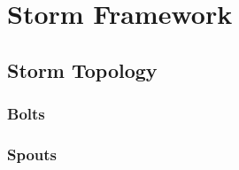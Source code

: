 \section{Storm Framework}
\label{sect:Architecture}


\subsection{Storm Topology}

\subsubsection{Bolts}

\subsubsection{Spouts}